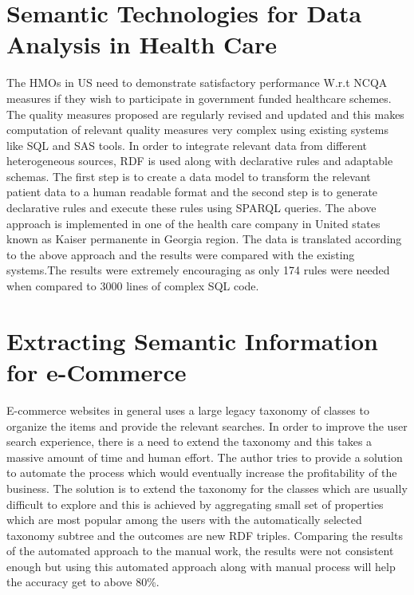     \section{Semantic Technologies for Data Analysis in Health Care}


    The HMOs in US need to demonstrate satisfactory performance W.r.t NCQA measures if they wish to participate in government funded healthcare schemes. The quality measures proposed are regularly revised and updated and this makes computation of relevant quality measures very complex using existing systems like SQL and SAS tools.
    In order to integrate relevant data from different heterogeneous sources, RDF is used along with declarative rules and adaptable schemas. The first step is to create a data model to transform the relevant patient data to a human readable format and the second step is to generate declarative rules and execute these rules using SPARQL queries.
    The above approach is implemented in one of the health care company in United states known as Kaiser permanente in Georgia region. The data is translated according to the above approach and the results were compared with the existing systems.The results were extremely encouraging as only 174 rules were needed when compared to 3000 lines of complex SQL code.
 

    \section{Extracting Semantic Information for e-Commerce}

    
    E-commerce websites in general uses a large legacy taxonomy of classes to organize the items and provide the relevant searches. In order to improve the user search experience, there is a need to extend the taxonomy and this takes a massive amount of time and human effort. The author tries to provide a solution to automate the process which would eventually increase the profitability of the business.
    The solution is to extend the taxonomy for the classes which are usually difficult to explore and this is achieved by aggregating small set of properties which are most popular among the users with the automatically selected taxonomy subtree and the outcomes are new RDF triples.
    Comparing the results of the automated approach to the manual work, the results were not consistent enough but using this automated approach along with manual process will help the accuracy get to above 80\%.
